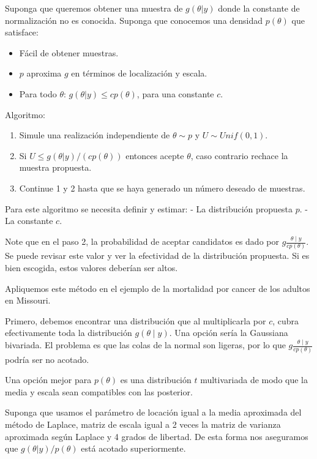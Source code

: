 \documentclass[
  12pt,
]{book}
\providecommand{\tightlist}{%
  \setlength{\itemsep}{0pt}\setlength{\parskip}{0pt}}
\theoremstyle{definition}
\theoremstyle{definition}
\theoremstyle{definition}
\theoremstyle{definition}
\theoremstyle{remark}
\begin{document}
Suponga que queremos obtener una muestra de \(g(\theta|y)\) donde la constante de normalización no es conocida. Suponga que conocemos una densidad \(p(\theta)\) que satisface:

\begin{itemize}
\tightlist
\item
  Fácil de obtener muestras.
\item
  \(p\) aproxima \(g\) en términos de localización y escala.
\item
  Para todo \(\theta\): \(g(\theta|y)\leq cp(\theta)\), para una constante \(c\).
\end{itemize}

Algoritmo:

\begin{enumerate}
\def\labelenumi{\arabic{enumi}.}
\tightlist
\item
  Simule una realización independiente de \(\theta \sim p\) y \(U\sim Unif(0,1)\).
\item
  Si \(U\leq g(\theta|y)/(cp(\theta))\) entonces acepte \(\theta\), caso contrario rechace la muestra propuesta.
\item
  Continue 1 y 2 hasta que se haya generado un número deseado de muestras.
\end{enumerate}

Para este algoritmo se necesita definir y estimar:
- La distribución propuesta \(p\).
- La constante \(c\).

Note que en el paso 2, la probabilidad de aceptar candidatos es dado por \(g\frac{\theta\mid y}{cp(\theta)}\). Se puede revisar este valor y ver la efectividad de la distribución propuesta. Si es bien escogida, estos valores deberían ser altos.

Apliquemos este método en el ejemplo de la mortalidad por cancer de los adultos en Missouri.

Primero, debemos encontrar una distribución que al multiplicarla por \(c\), cubra efectivamente toda la distribución \(g(\theta\mid y)\). Una opción sería la Gaussiana bivariada. El problema es que las colas de la normal son ligeras, por lo que \(g\frac{\theta\mid y}{cp(\theta)}\) podría ser no acotado.

Una opción mejor para \(p(\theta)\) es una distribución \(t\) multivariada de modo que la media y escala sean compatibles con las posterior.

Suponga que usamos el parámetro de locación igual a la media aproximada del método de Laplace, matriz de escala igual a 2 veces la matriz de varianza aproximada según Laplace y 4 grados de libertad. De esta forma nos aseguramos que \(g(\theta|y)/p(\theta)\) está acotado superiormente.
\end{document}
